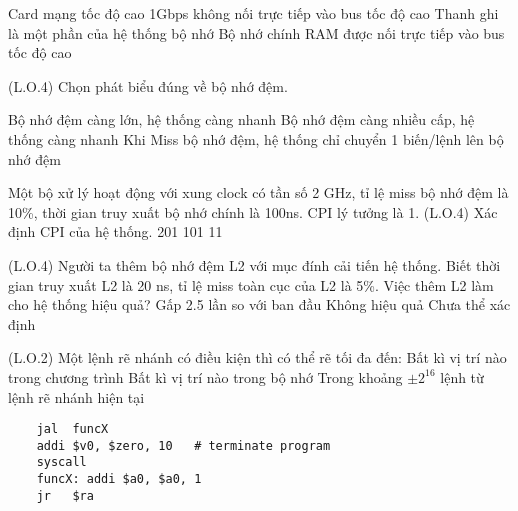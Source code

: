 \fourch
{Card mạng tốc độ cao 1Gbps không nối trực tiếp vào bus tốc độ cao}
{Thanh ghi là một phần của hệ thống bộ nhớ}
{}
{Bộ nhớ chính RAM được nối trực tiếp vào bus tốc độ cao}



\question (L.O.4) Chọn phát biểu đúng về bộ nhớ đệm.

\fourch
{Bộ nhớ đệm càng lớn, hệ thống càng nhanh}
{Bộ nhớ đệm càng nhiều cấp, hệ thống càng nhanh}
{Khi Miss bộ nhớ đệm, hệ thống chỉ chuyển 1 biến/lệnh lên bộ nhớ đệm}
{}

Một bộ xử lý hoạt động với xung clock có tần số 2 GHz, tỉ lệ miss bộ nhớ đệm là 10\%, thời gian truy xuất bộ nhớ chính là 100ns. CPI lý tưởng là 1.
\question (L.O.4) Xác định CPI của hệ thống.
\onech
{}
{201}
{101}
{11}
\label{2020CS_M2-s}

\question (L.O.4) Người ta thêm bộ nhớ đệm L2 với mục đính cải tiến hệ thống. Biết thời gian truy xuất L2 là 20 ns, tỉ lệ miss toàn cục của L2 là 5\%. Việc thêm L2 làm cho hệ thống hiệu quả?
\choice
{Gấp 2.5 lần so với ban đầu}
{}
{Không hiệu quả}
{Chưa thể xác định }

\label{2020CS_M2-e}

	\question (L.O.2) Một lệnh rẽ nhánh có điều kiện thì có thể rẽ tối đa đến:
\choice
{Bất kì vị trí nào trong chương trình}
{Bất kì vị trí nào trong bộ nhớ}
{}
{Trong khoảng $\pm 2^{16}$ lệnh từ lệnh rẽ nhánh hiện tại}

\begin{lstlisting}
	jal  funcX
	addi $v0, $zero, 10   # terminate program
	syscall               		
	funcX: addi $a0, $a0, 1
	jr   $ra
\end{lstlisting}


